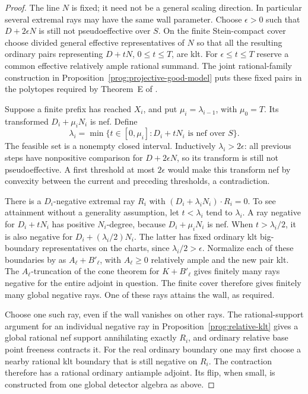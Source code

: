 \begin{proof}
The line \(N\) is fixed; it need not be a general scaling direction.
In particular several extremal rays may have the same wall
parameter. Choose \(\epsilon>0\) such that \(D+2\epsilon N\) is
still not pseudoeffective over \(S\). On the finite Stein-compact
cover choose divided general effective representatives of \(N\)
so that all the resulting ordinary pairs representing \(D+tN\),
\(0\leq t\leq T\), are klt. For
\(\epsilon\leq t\leq T\) reserve a common effective relatively
ample rational summand. The joint rational-family construction in
Proposition~\ref{prog:projective-good-model} puts these fixed pairs
in the polytopes required by Theorem~E of
\cite{FujinoAnalyticBCHM}.

Suppose a finite prefix has reached \(X_i\), and put
\(\mu_i=\lambda_{i-1}\), with \(\mu_0=T\). Its transformed
\(D_i+\mu_iN_i\) is nef. Define
\[
 \lambda_i=\min\{t\in[0,\mu_i]:D_i+tN_i
                         \text{ is nef over }S\}.
\]
The feasible set is a nonempty closed interval. Inductively
\(\lambda_i>2\epsilon\): all previous steps have nonpositive
comparison for \(D+2\epsilon N\), so its transform is still not
pseudoeffective. A first threshold at most \(2\epsilon\) would
make this transform nef by convexity between the current and
preceding thresholds, a contradiction.

There is a \(D_i\)-negative extremal ray \(R_i\) with
\((D_i+\lambda_iN_i)\cdot R_i=0\). To see attainment without a
generality assumption, let \(t<\lambda_i\) tend to \(\lambda_i\).
A ray negative for \(D_i+tN_i\) has positive \(N_i\)-degree,
because \(D_i+\mu_iN_i\) is nef. When \(t>\lambda_i/2\), it is
also negative for \(D_i+(\lambda_i/2)N_i\). The latter has fixed
ordinary klt big-boundary representatives on the charts, since
\(\lambda_i/2>\epsilon\). Normalize each of these boundaries by
\cite[Lemma~11.15]{FujinoAnalyticBCHM} as \(A_\ell+B'_\ell\),
with \(A_\ell\geq0\) relatively ample and the new pair klt.
The \(A_\ell\)-truncation of the cone theorem for
\(K+B'_\ell\) gives finitely many rays negative for the entire
adjoint in question. The finite cover therefore gives finitely
many global negative rays. One of these rays attains the wall,
as required.

Choose one such ray, even if the wall vanishes on other rays.
The rational-support argument for an individual negative ray in
Proposition~\ref{prog:relative-klt} gives a global rational nef
support annihilating exactly \(R_i\), and ordinary relative base
point freeness contracts it. For the real ordinary boundary one
may first choose a nearby rational klt boundary that is still
negative on \(R_i\). The contraction therefore has a rational
ordinary antiample adjoint. Its flip, when small, is constructed
from one global detector algebra as above.


\end{proof}
